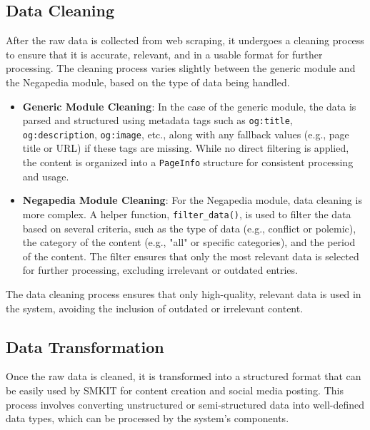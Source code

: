 \subsection{Data Cleaning}
\label{subsec:data_cleaning}
After the raw data is collected from web scraping, it undergoes a cleaning process to ensure that it is accurate, relevant, and in a usable format for further processing. The cleaning process varies slightly between the generic module and the Negapedia module, based on the type of data being handled.

\begin{itemize}
    \item \textbf{Generic Module Cleaning}: In the case of the generic module, the data is parsed and structured using metadata tags such as \texttt{og:title}, \texttt{og:description}, \texttt{og:image}, etc., along with any fallback values (e.g., page title or URL) if these tags are missing. While no direct filtering is applied, the content is organized into a \texttt{PageInfo} structure for consistent processing and usage.
    
    \item \textbf{Negapedia Module Cleaning}: For the Negapedia module, data cleaning is more complex. A helper function, \texttt{filter\_data()}, is used to filter the data based on several criteria, such as the type of data (e.g., conflict or polemic), the category of the content (e.g., "all" or specific categories), and the period of the content. The filter ensures that only the most relevant data is selected for further processing, excluding irrelevant or outdated entries.
\end{itemize}

The data cleaning process ensures that only high-quality, relevant data is used in the system, avoiding the inclusion of outdated or irrelevant content.

\subsection{Data Transformation}
\label{subsec:data_transformation}
Once the raw data is cleaned, it is transformed into a structured format that can be easily used by SMKIT for content creation and social media posting. This process involves converting unstructured or semi-structured data into well-defined data types, which can be processed by the system’s components.

